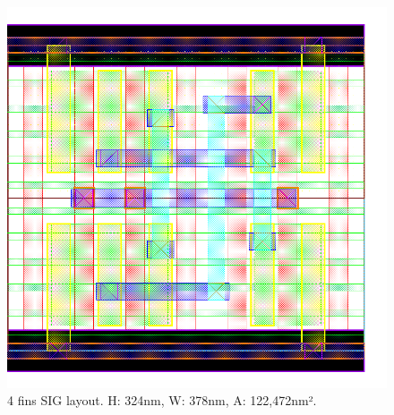 \documentclass[diss,pgmicro,english]{iiufrgs}
\begin{document}
\begin{figure}[]
\centering
\includegraphics[width=\textwidth,height=\textheight,keepaspectratio]{SIG4F.png}
\caption{4 fins SIG layout. H: 324nm, W: 378nm, A: 122,472nm².}
\label{fig:SIG4F}
\end{figure}
\end{document}

